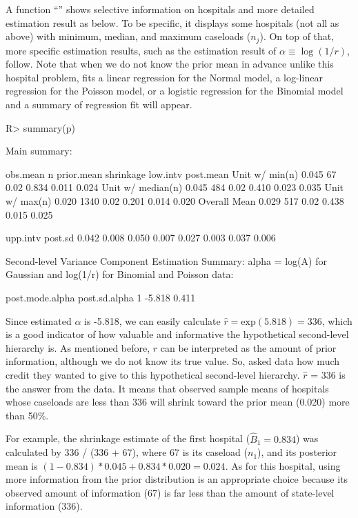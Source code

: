 \documentclass[article]{jss}
\begin{document}
A function ``'' shows selective information on hospitals and more detailed estimation result as below. To be specific, it displays some hospitals (not all as above) with minimum, median, and maximum caseloads ($n_{j}$). On top of that, more specific estimation results, such as the estimation result of $\alpha\equiv\log(1/r)$, follow. Note that when we do not know the prior mean in advance unlike this hospital problem,  fits a linear regression for the Normal model, a log-linear regression for the Poisson model, or a logistic regression for the Binomial model and a summary of regression fit will appear.
\begin{CodeChunk}
\begin{CodeInput}
R> summary(p)
\end{CodeInput}
\begin{CodeOutput}
Main summary:

                  obs.mean    n prior.mean shrinkage low.intv post.mean
Unit w/ min(n)       0.045   67       0.02     0.834    0.011     0.024
Unit w/ median(n)    0.045  484       0.02     0.410    0.023     0.035
Unit w/ max(n)       0.020 1340       0.02     0.201    0.014     0.020
Overall Mean         0.029  517       0.02     0.438    0.015     0.025

                  upp.intv post.sd
                     0.042   0.008
                     0.050   0.007
                     0.027   0.003
                     0.037   0.006

Second-level Variance Component Estimation Summary:
alpha = log(A) for Gaussian and log(1/r) for Binomial and Poisson data:

  post.mode.alpha post.sd.alpha
1          -5.818         0.411
\end{CodeOutput}
\end{CodeChunk}
Since estimated $\alpha$ is -5.818, we can easily calculate $\hat{r}=\textrm{exp}(5.818)=336$, which is a good indicator of how valuable and informative the hypothetical second-level hierarchy is. As mentioned before, $r$ can be interpreted as the amount of prior information, although we do not know its true value. So,  asked data how much credit they wanted to give to this hypothetical second-level hierarchy. $\hat{r}$ = 336 is the answer from the data. It means that observed sample means of hospitals whose caseloads are less than 336 will shrink toward the prior mean (0.020) more than 50\%. 


For example, the shrinkage estimate of the first hospital ($\hat{B}_{1}= 0.834$) was calculated by 336 / (336 + 67), where 67 is its caseload ($n_{1}$), and its posterior mean is $(1-0.834)*0.045 + 0.834 * 0.020=0.024$. As for this hospital, using more information from the prior distribution is an appropriate choice because its observed amount of information (67) is far less than the amount of state-level information (336).
\end{document}
